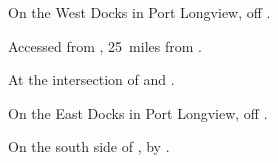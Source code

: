
\begin{LocationList}

On the West Docks in Port Longview, off .

Accessed from , 25~miles from  .

\Location{\GasStation \Gas}
At the intersection of  and .

On the East Docks in Port Longview, off .

\Location{\RestArea \Rest}
On the south side of , by  .

\end{LocationList}
